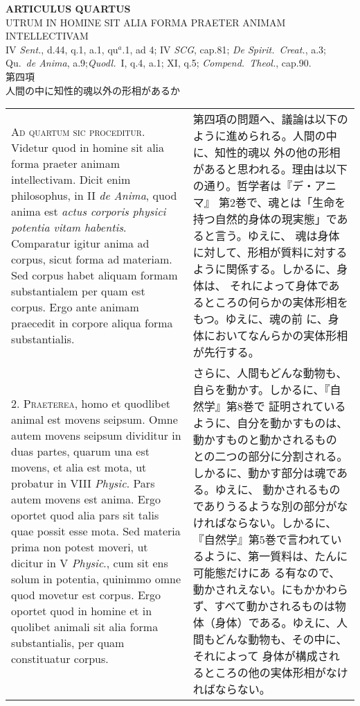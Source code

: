 \documentclass[paper=a4paper,fontsize=10pt,jafontsize=9pt,titlepage]{jlreq}
\begin{document}
\newpage
{}
\begin{center}
{\Large {\bfseries ARTICULUS QUARTUS}}\\
{\large UTRUM IN HOMINE SIT ALIA FORMA PRAETER ANIMAM INTELLECTIVAM}\\
 {\footnotesize IV {\itshape Sent.}, d.44, q.1, a.1, qu$^{a}$.1, ad 4; IV {\itshape SCG}, cap.81; {\itshape De Spirit.~Creat.}, a.3; \\Qu.~{\itshape de Anima}, a.9;{\itshape Quodl.}~I, q.4, a.1; XI, q.5; {\itshape Compend.~Theol.}, cap.90.}\\
{\Large 第四項\\人間の中に知性的魂以外の形相があるか}
\end{center}

\begin{longtable}{p{21em}p{21em}}
{\scshape Ad quartum sic proceditur}. Videtur quod in homine sit alia
forma praeter animam intellectivam. Dicit enim philosophus, in II
{\itshape de Anima}, quod anima est {\itshape actus corporis physici
potentia vitam habentis}. Comparatur igitur anima ad corpus, sicut
forma ad materiam. Sed corpus habet aliquam formam substantialem per
quam est corpus. Ergo ante animam praecedit in corpore aliqua forma
substantialis.

&

 第四項の問題へ、議論は以下のように進められる。人間の中に、知性的魂以
 外の他の形相があると思われる。理由は以下の通り。哲学者は『デ・アニマ』
 第2巻で、魂とは「生命を持つ自然的身体の現実態」であると言う。ゆえに、
 魂は身体に対して、形相が質料に対するように関係する。しかるに、身体は、
 それによって身体であるところの何らかの実体形相をもつ。ゆえに、魂の前
 に、身体においてなんらかの実体形相が先行する。
 
\\


2. {\scshape Praeterea}, homo et quodlibet animal est movens
seipsum. Omne autem movens seipsum dividitur in duas partes, quarum
una est movens, et alia est mota, ut probatur in VIII {\itshape
Physic}. Pars autem movens est anima. Ergo oportet quod alia pars sit
talis quae possit esse mota. Sed materia prima non potest moveri, ut
dicitur in V {\itshape Physic}., cum sit ens solum in potentia,
quinimmo omne quod movetur est corpus. Ergo oportet quod in homine et
in quolibet animali sit alia forma substantialis, per quam
constituatur corpus.

&

 さらに、人間もどんな動物も、自らを動かす。しかるに、『自然学』第8巻で
 証明されているように、自分を動かすものは、動かすものと動かされるもの
 との二つの部分に分割される。しかるに、動かす部分は魂である。ゆえに、
 動かされるものでありうるような別の部分がなければならない。しかるに、
 『自然学』第5巻で言われているように、第一質料は、たんに可能態だけにあ
 る有なので、動かされえない。にもかかわらず、すべて動かされるものは物
 体（身体）である。ゆえに、人間もどんな動物も、その中に、それによって
 身体が構成されるところの他の実体形相がなければならない。
 

\end{longtable}
\end{document}

